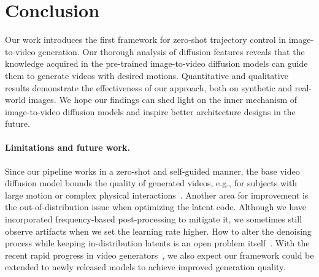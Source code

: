 \vspace{-3.0mm}
\section{Conclusion}
\label{sec:conclusion}
\vspace{-2.0mm}
Our work introduces the first framework for zero-shot trajectory control in image-to-video generation.
Our thorough analysis of diffusion features reveals that the knowledge acquired in the pre-trained image-to-video diffusion models can guide them to generate videos with desired motions. %
Quantitative and qualitative results demonstrate the effectiveness of our approach, both on synthetic and real-world images.
We hope our findings can shed light on the inner mechanism of image-to-video diffusion models and inspire better architecture designs in the future.

\vspace{-2.0mm}
\paragraph{Limitations and future work.}
Since our pipeline works in a zero-shot and self-guided manner, the base video diffusion model bounds the quality of generated videos, e.g., for subjects with large motion or complex physical interactions~\citep{blattmann2023stable}.
Another area for improvement is the out-of-distribution issue when optimizing the latent code. %
Although we have incorporated frequency-based post-processing to mitigate it, we sometimes still observe artifacts when we set the learning rate higher.
How to alter the denoising process while keeping in-distribution latents is an open problem itself~\citep{he2023manifold,ReNoiseInversion}.
With the recent rapid progress in video generators~\citep{Sora,WALT}, we also expect our framework could be extended to newly released models to achieve improved generation quality. %

